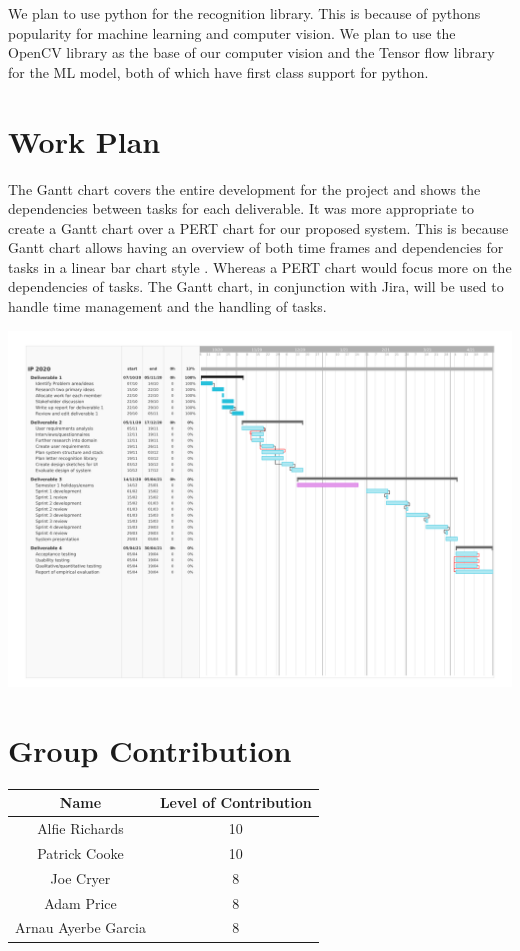 \documentclass[10pt]{article}
\begin{document}
We plan to use python for the recognition library. This is because of pythons popularity for 
machine learning and computer vision. We plan to use the OpenCV library as the base of our 
computer vision and the Tensor flow library for the ML model, both of which have first class 
support for python.

\section{Work Plan}

The Gantt chart covers the entire development for the project and shows the dependencies between 
tasks for each deliverable. It was more appropriate to create a Gantt chart over a PERT chart for 
our proposed system. This is because Gantt chart allows having an overview of both time frames and 
dependencies for tasks in a linear bar chart style . Whereas a PERT chart would focus more on the 
dependencies of tasks. The Gantt chart, in conjunction with Jira, will be used to handle time 
management and the handling of tasks.

\includegraphics[width=\textwidth]{IpGantt.png}

\newpage




\newpage

\section{Group Contribution}

\begin{center}
\begin{tabular}{ |c|c| }
  \hline
  Name & Level of Contribution \\
  \hline
  Alfie Richards & 10 \\
  Patrick Cooke & 10 \\
  Joe Cryer & 8 \\
  Adam Price & 8 \\
  Arnau Ayerbe Garcia & 8 \\
  \hline
\end{tabular}
\end{center}
\end{document}

